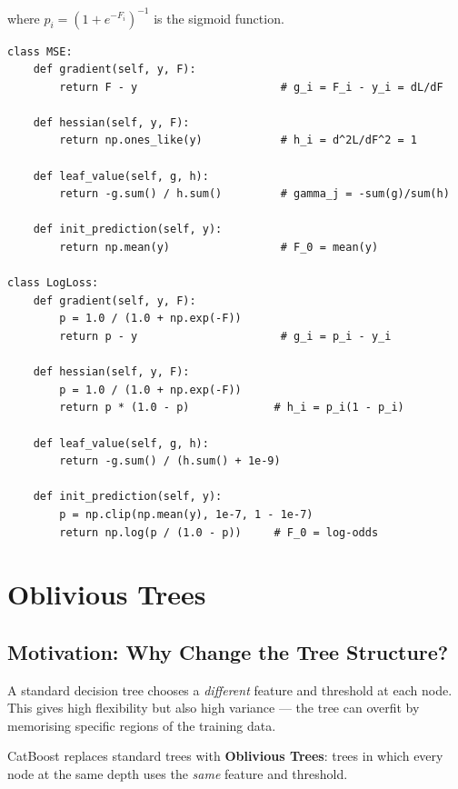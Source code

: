 \documentclass[11pt, a4paper]{article}
\begin{document}
where $p_i = (1 + e^{-F_i})^{-1}$ is the sigmoid function.

\begin{listing}[H]
\caption{Loss functions (\texttt{loss.py})}
\begin{verbatim}
class MSE:
    def gradient(self, y, F):
        return F - y                      # g_i = F_i - y_i = dL/dF

    def hessian(self, y, F):
        return np.ones_like(y)            # h_i = d^2L/dF^2 = 1

    def leaf_value(self, g, h):
        return -g.sum() / h.sum()         # gamma_j = -sum(g)/sum(h)

    def init_prediction(self, y):
        return np.mean(y)                 # F_0 = mean(y)

class LogLoss:
    def gradient(self, y, F):
        p = 1.0 / (1.0 + np.exp(-F))
        return p - y                      # g_i = p_i - y_i

    def hessian(self, y, F):
        p = 1.0 / (1.0 + np.exp(-F))
        return p * (1.0 - p)             # h_i = p_i(1 - p_i)

    def leaf_value(self, g, h):
        return -g.sum() / (h.sum() + 1e-9)

    def init_prediction(self, y):
        p = np.clip(np.mean(y), 1e-7, 1 - 1e-7)
        return np.log(p / (1.0 - p))     # F_0 = log-odds
\end{verbatim}
\end{listing}

\section{Oblivious Trees}

\subsection{Motivation: Why Change the Tree Structure?}

A standard decision tree chooses a \emph{different} feature and threshold
at each node. This gives high flexibility but also high variance ---
the tree can overfit by memorising specific regions of the training data.

CatBoost replaces standard trees with \textbf{Oblivious Trees}:
trees in which every node at the same depth uses the \emph{same}
feature and threshold.
\end{document}
